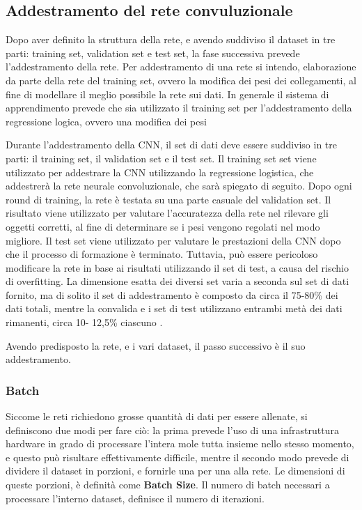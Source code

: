 \documentclass[14pt]{extarticle}
\begin{document}
\subsection{Addestramento del rete convuluzionale}
Dopo aver definito la struttura della rete, e avendo suddiviso il dataset in tre parti: training set, validation set e test set, la fase successiva prevede l'addestramento della rete.
Per addestramento di una rete si intendo, elaborazione da parte della  rete del training set, ovvero la modifica dei pesi dei collegamenti, al fine di modellare il meglio possibile la rete sui dati.
In generale il sistema di apprendimento prevede che sia utilizzato il training set per l'addestramento della regressione logica, ovvero una modifica dei pesi 

Durante l'addestramento della CNN, il set di dati deve essere suddiviso in tre parti:
il training set, il validation set e il test set. Il training set
set viene utilizzato per addestrare la CNN utilizzando la regressione logistica, che addestrerà la rete neurale convoluzionale, che sarà spiegato di seguito. Dopo ogni round di training, la rete è
testata su una parte casuale del validation set. Il risultato viene utilizzato per valutare l'accuratezza della rete nel rilevare gli oggetti corretti,
al fine di determinare se i pesi vengono regolati nel modo migliore.
Il test set viene utilizzato per valutare le prestazioni della CNN dopo che
il processo di formazione è terminato. Tuttavia, può essere pericoloso modificare
la rete in base ai risultati utilizzando il set di test, a causa del rischio
di overfitting. La dimensione esatta dei diversi set varia a seconda
sul set di dati fornito, ma di solito il set di addestramento è composto da
circa il 75-80\% dei dati totali, mentre la convalida e
i set di test utilizzano entrambi metà dei dati rimanenti, circa 10-
12,5\% ciascuno \cite{guyon1997scaling}.



Avendo predisposto la rete, e i vari dataset, il passo successivo è il suo addestramento.

\subsubsection{Batch}
Siccome le reti richiedono grosse quantità di dati per essere allenate, si definiscono due modi per fare ciò: la prima prevede l'uso di una infrastruttura hardware in grado di processare l'intera mole tutta insieme nello stesso momento, e questo può risultare effettivamente difficile, mentre il secondo modo prevede di dividere il dataset in porzioni, e fornirle una per una alla rete.
Le dimensioni di queste porzioni, è definità come \textbf{Batch Size}.
Il numero di batch  necessari a processare l'interno dataset, definisce il numero di iterazioni.
\end{document}
